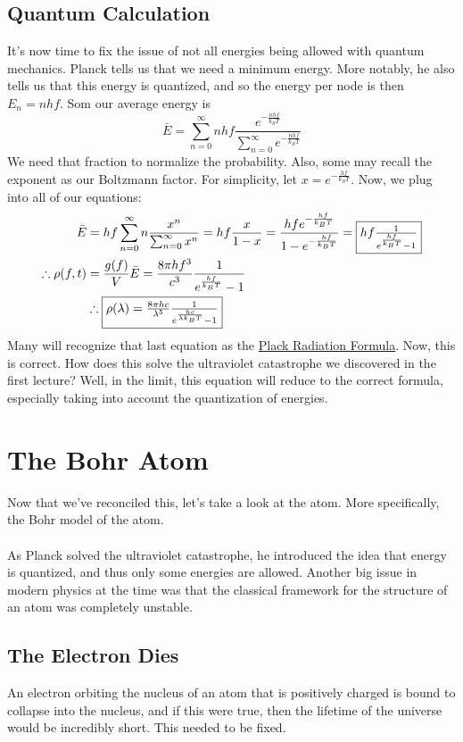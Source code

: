         \subsection{Quantum Calculation}
        It's now time to fix the issue of not all energies being allowed with quantum mechanics. Planck tells us that we need a minimum energy. More notably, he also tells us that this energy is quantized, and so the energy per node is then $E_n = nhf$. Som our average energy is
        $$\bar{E} = \sum_{n=0}^{\infty}nhf\frac{e^{-\frac{nhf}{k_BT}}}{\sum_{n=0}^{\infty}e^{-\frac{nhf}{k_BT}}}$$
        We need that fraction to normalize the probability. Also, some may recall the exponent as our Boltzmann factor. For simplicity, let $x = e^{-\frac{hf}{k_BT}}$. Now, we plug into all of our equations:
        \begin{align*}
          \bar{E} &= hf\sum_{n=0}^{\infty}n\frac{x^n}{\sum_{n=0}^{\infty}x^n} = hf\frac{x}{1-x} = \frac{hfe^{-\frac{hf}{k_BT}}}{1 - e^{-\frac{hf}{k_BT}}} = \fbox{$hf\frac{1}{e^{\frac{hf}{k_BT}} - 1}$}\\
          \therefore \rho(f,t) &= \frac{g(f)}{V}\bar{E} = \frac{8\pi hf^3}{c^3}\frac{1}{e^{\frac{hf}{k_BT}} - 1}\\
          &\therefore \fbox{$\rho(\lambda) = \frac{8\pi hc}{\lambda^5}\frac{1}{e^{\frac{hc}{\lambda k_BT}} -1}$}
        \end{align*}
        Many will recognize that last equation as the \underline{Plack Radiation Formula}. Now, this is correct. How does this solve the ultraviolet catastrophe we discovered in the first lecture? Well, in the limit, this equation will reduce to the correct formula, especially taking into account the quantization of energies.

      \section{The Bohr Atom}
        Now that we've reconciled this, let's take a look at the atom. More specifically, the Bohr model of the atom.\\\\

        As Planck solved the ultraviolet catastrophe, he introduced the idea that energy is quantized, and thus only some energies are allowed. Another big issue in modern physics at the time was that the classical framework for the structure of an atom was completely unstable.

        \subsection{The Electron Dies}
          An electron orbiting the nucleus of an atom that is positively charged is bound to collapse into the nucleus, and if this were true, then the lifetime of the universe would be incredibly short. This needed to be fixed.

